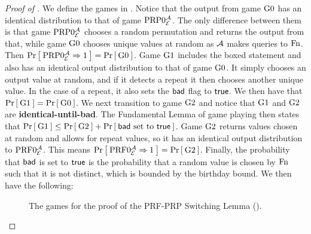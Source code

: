 \begin{proof}[Proof of ]
	 We define the games in . Notice that the output from game ${{\textnormal G}}0$ has an identical distribution to that of game $\textnormal{PRP}0_{\cal E}^{\mathcal A}$. The only difference between them is that game $\textnormal{PRP}0_{\cal E}^{\mathcal A}$ chooses a random permutation and returns the output from that, while game ${{\textnormal G}}0$ chooses unique values at random as ${\mathcal A}$ makes queries to $\textnormal{Fn}$. Then $\Pr\left[\: \textnormal{PRP}0_{\cal E}^{\mathcal A}\Rightarrow1 \:\right] = \Pr\left[\: {{\textnormal G}}0 \:\right]$. Game ${{\textnormal G}}1$ includes the boxed statement and also has an identical output distribution to that of game ${{\textnormal G}}0$. It simply chooses an output value at random, and if it detects a repeat it then chooses another unique value. In the case of a repeat, it also sets the $\mathsf{bad}$ flag to $\mathsf{true}$. We then have that $\Pr\left[\: {{\textnormal G}}1 \:\right] = \Pr\left[\: {{\textnormal G}}0 \:\right]$. We next transition to game ${{\textnormal G}}2$ and notice that ${{\textnormal G}}1$ and ${{\textnormal G}}2$ are \textbf{identical-until-bad}. The Fundamental Lemma of game playing then states that $\Pr\left[\: {{\textnormal G}}1 \:\right] \leq \Pr\left[\: {{\textnormal G}}2 \:\right] + \Pr\left[\: \mathsf{bad} \text{ set to } \mathsf{true} \:\right]$. Game ${{\textnormal G}}2$ returns values chosen at random and allows for repeat values, so it has an identical output distribution to $\textnormal{PRF}0_{\cal E}^{\mathcal A}$. This means $\Pr\left[\: \textnormal{PRF}0_{\cal E}^{\mathcal A}\Rightarrow1 \:\right] = \Pr\left[\: {{\textnormal G}}2 \:\right]$. Finally, the probability that $\mathsf{bad}$ is set to $\mathsf{true}$ is the probability that a random value is chosen by $\textnormal{Fn}$ such that it is not distinct, which is bounded by the birthday bound. We then have the following:
	 
	 \begin{figure}
	 	\centering
	 	\caption{The games for the proof of the PRF-PRP Switching Lemma ().}
	 	\label{fig:switching}	
	 \end{figure} 
	 

\end{proof}
